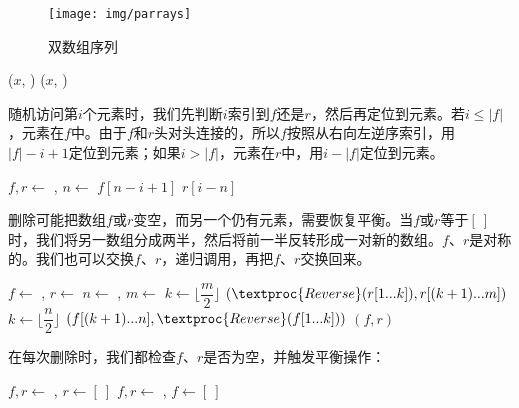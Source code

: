 \documentclass[b5paper]{ctexart}
\begin{document}
\begin{figure}[htbp]
  \centering
  \texttt{[image: img/parrays]}
  \caption{双数组序列}
  \label{fig:parrays}
\end{figure}

\begin{algorithmic}[1]
  \State {}($x$, )
\EndFunction
{}
  \State {}($x$, )
\EndFunction
\end{algorithmic}

随机访问第$i$个元素时，我们先判断$i$索引到$f$还是$r$，然后再定位到元素。若$ i \leq |f|$，元素在$f$中。由于$f$和$r$头对头连接的，所以$f$按照从右向左逆序索引，用$|f| - i + 1$定位到元素；如果$i > |f|$，元素在$r$中，用$i - |f|$定位到元素。

\begin{algorithmic}[1]
  \State $f, r \gets $ , 
  \State $n \gets $ 
    \State \Return $f[n - i + 1]$ 
  \Else
    \State \Return $r[i - n]$
  \EndIf
\EndFunction
\end{algorithmic}

删除可能把数组$f$或$r$变空，而另一个仍有元素，需要恢复平衡。当$f$或$r$等于$[\ ]$时，我们将另一数组分成两半，然后将前一半反转形成一对新的数组。$f$、$r$是对称的。我们也可以交换$f$、$r$，递归调用，再把$f$、$r$交换回来。

\begin{algorithmic}[1]
  \State $f \gets$ , $r \gets$ 
  \State $n \gets$ , $m \gets$ 
    \State $k \gets \lfloor \dfrac{m}{2} \rfloor$
    \State \Return $(\textproc{Reverse}(r[1 ... k]), r[(k + 1) ... m])$
  \EndIf
    \State $k \gets \lfloor \dfrac{n}{2} \rfloor$
    \State \Return $(f[(k + 1) ... n], \textproc{Reverse}(f[1 ... k]))$
  \EndIf
  \State \Return $(f, r)$
\EndFunction
\end{algorithmic}

在每次删除时，我们都检查$f$、$r$是否为空，并触发平衡操作：

\begin{algorithmic}[1]
  \State {}
  \State $f, r \gets$ , 
   
    \State $r \gets [\ ]$
  \Else
    \State {}
  \EndIf
\EndFunction
\Statex
{}
  \State {}
  \State $f, r \gets$ , 
   
    \State $f \gets [\ ]$
  \Else
    \State {}
  \EndIf
\EndFunction
\end{algorithmic}
\end{document}
